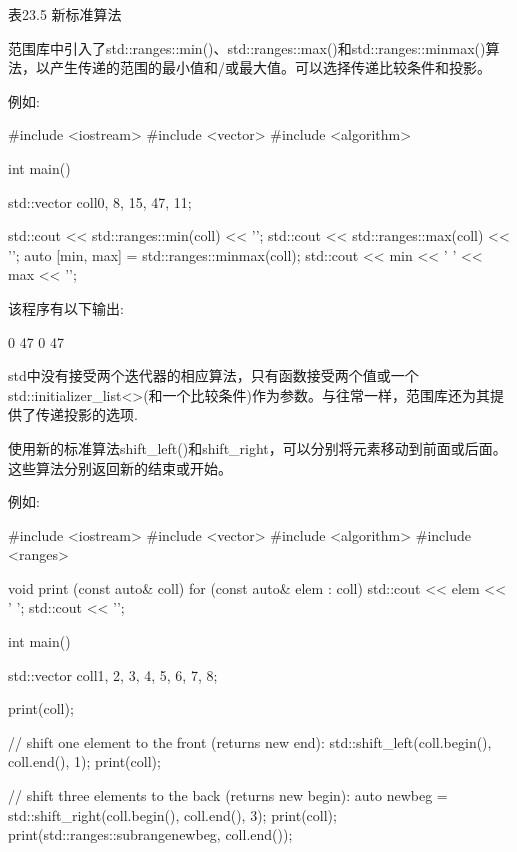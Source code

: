 \begin{center}
表23.5 新标准算法
\end{center}


范围库中引入了std::ranges::min()、std::ranges::max()和std::ranges::minmax()算法，以产生传递的范围的最小值和/或最大值。可以选择传递比较条件和投影。

例如:


\begin{cpp}
#include <iostream>
#include <vector>
#include <algorithm>

int main()
{
	std::vector coll{0, 8, 15, 47, 11};

	std::cout << std::ranges::min(coll) << '\n';
	std::cout << std::ranges::max(coll) << '\n';
	auto [min, max] = std::ranges::minmax(coll);
	std::cout << min << ' ' << max << '\n';
}
\end{cpp}

该程序有以下输出:

\begin{shell}
0
47
0 47
\end{shell}

std中没有接受两个迭代器的相应算法，只有函数接受两个值或一个std::initializer\_list<>(和一个比较条件)作为参数。与往常一样，范围库还为其提供了传递投影的选项.


使用新的标准算法shift\_left()和shift\_right，可以分别将元素移动到前面或后面。这些算法分别返回新的结束或开始。

例如:


\begin{cpp}
#include <iostream>
#include <vector>
#include <algorithm>
#include <ranges>

void print (const auto& coll)
{
	for (const auto& elem : coll) {
		std::cout << elem << ' ';
	}
	std::cout << '\n';
}

int main()
{
	std::vector coll{1, 2, 3, 4, 5, 6, 7, 8};

	print(coll);

	// shift one element to the front (returns new end):
	std::shift_left(coll.begin(), coll.end(), 1);
	print(coll);

	// shift three elements to the back (returns new begin):
	auto newbeg = std::shift_right(coll.begin(), coll.end(), 3);
	print(coll);
	print(std::ranges::subrange{newbeg, coll.end()});
}
\end{cpp}

